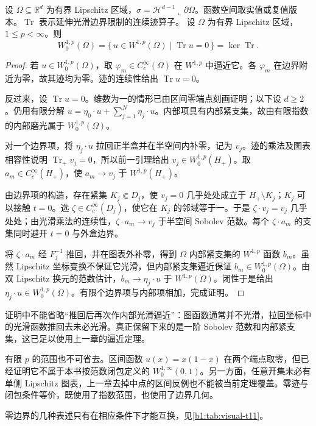 \begin{theorem}[零迹刻画]\label{b1:thm:zero-trace-characterization}
设 \(\Omega\subseteq\mathbb R^d\) 为有界 Lipschitz 区域，\(\sigma=\mathcal H^{d-1}\llcorner\partial\Omega\)。函数空间取实值或复值版本。\(\operatorname{Tr}\) 表示延伸光滑边界限制的连续迹算子。
设 \(\Omega\) 为有界 Lipschitz 区域，\(1\le p<\infty\)。则
\[
 W_0^{1,p}(\Omega)
 =\{\,u\in W^{1,p}(\Omega)\mid\operatorname{Tr}u=0\,\}
 =\ker\operatorname{Tr}.
\]
\end{theorem}
\begin{proof}
若 \(u\in W_0^{1,p}(\Omega)\)，取 \(\varphi_m\in C_c^\infty(\Omega)\) 在 \(W^{1,p}\) 中逼近它。各 \(\varphi_m\) 在边界附近为零，故其迹均为零。迹的连续性给出 \(\operatorname{Tr}u=0\)。

反过来，设 \(\operatorname{Tr}u=0\)。维数为一的情形已由区间零端点刻画证明；以下设 \(d\ge2\)。仍用有限分解 \(u=\eta_0\cdot u+\sum_{j=1}^N\eta_j\cdot u\)。内部项具有内部紧支集，故由有限指数的内部磨光属于 \(W_0^{1,p}(\Omega)\)。

对一个边界项，将 \(\eta_j\cdot u\) 拉回正半盒并在半空间内补零，记为 \(v_j\)。迹的乘法及图表相容性说明 \(\operatorname{Tr}_+v_j=0\)，所以前一引理给出 \(v_j\in W_0^{1,p}(H_+)\)。取 \(a_m\in C_c^\infty(H_+)\)，使 \(a_m\to v_j\) 于 \(W^{1,p}(H_+)\)。

由边界项的构造，存在紧集 \(K_j\Subset D_j\)，使 \(v_j=0\) 几乎处处成立于 \(H_+\setminus K_j\)；\(K_j\) 可以接触 \(t=0\)。选 \(\zeta\in C_c^\infty(D_j)\)，使它在 \(K_j\) 的邻域等于一。于是 \(\zeta\cdot v_j=v_j\) 几乎处处；由光滑乘法的连续性，\(\zeta\cdot a_m\to v_j\) 于半空间 Sobolev 范数。每个 \(\zeta\cdot a_m\) 的支集同时避开 \(t=0\) 与外盒边界。

将 \(\zeta\cdot a_m\) 经 \(F_j^{-1}\) 推回，并在图表外补零，得到 \(\Omega\) 内部紧支集的 \(W^{1,p}\) 函数 \(b_m\)。虽然 Lipschitz 坐标变换不保证它光滑，但内部紧支集逼近保证 \(b_m\in W_0^{1,p}(\Omega)\)。由双 Lipschitz 换元的范数估计，\(b_m\to\eta_j\cdot u\) 于 \(W^{1,p}(\Omega)\)。闭性于是给出 \(\eta_j\cdot u\in W_0^{1,p}(\Omega)\)。有限个边界项与内部项相加，完成证明。
\end{proof}

证明中不能省略“推回后再次作内部光滑逼近”：图函数通常并不光滑，拉回坐标中的光滑函数推回去未必光滑。真正保留下来的是一阶 Sobolev 范数和内部紧支集，这已足以使用上一章的逼近定理。

\ProseParagraphBreak

有限 \(p\) 的范围也不可省去。区间函数 \(u(x)=x(1-x)\) 在两个端点取零，但已经证明它不属于本书按范数闭包定义的 \(W_0^{1,\infty}(0,1)\)。另一方面，任意开集未必有单侧 Lipschitz 图表，上一章去掉中点的区间反例也不能被当前定理覆盖。零迹与闭包条件等价，既使用了指数范围，也使用了边界几何。

零边界的几种表述只有在相应条件下才能互换，见\cref{b1:tab:visual-t11}。

